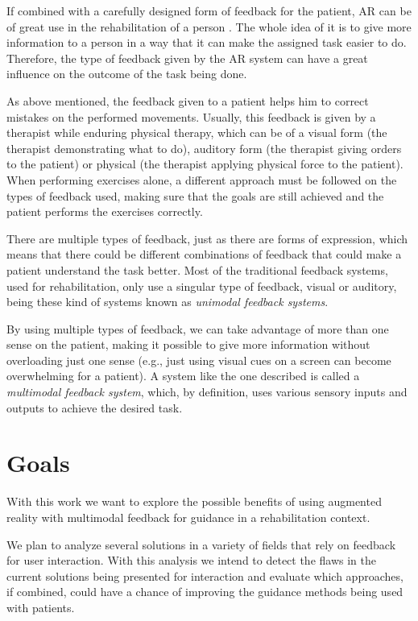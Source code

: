 If combined with a carefully designed form of feedback for the patient,
\ac{AR} can be of great use in the rehabilitation of a person \cite{Sigrist2013}. The whole 
idea of it is to give more information to a person in a way that it can make 
the assigned task easier to do.
Therefore, the type of feedback given by the \ac{AR} system can have a great influence 
on the outcome of the task being done.\cite{Causo2011}

As above mentioned, the feedback given to a patient helps him to correct mistakes on the performed movements.
Usually, this feedback is given by a therapist while enduring physical therapy, which can be of a visual form (the therapist demonstrating what to do), auditory form (the therapist giving orders to the patient) or physical (the therapist applying physical force to the patient). 
When performing exercises alone, a different approach must be followed on the types of feedback used, making sure that the goals 
are still achieved and the patient performs the exercises correctly.

There are multiple types of feedback, just as there are forms of expression, which means that 
there could be different combinations of feedback that could make a patient understand the task better.
Most of the traditional feedback systems, used for rehabilitation, only use a singular type of feedback,
visual or auditory\cite{Design2005}, being these kind of systems known as \emph{unimodal feedback systems}.

By using multiple types of feedback, we can take advantage of more than one sense on the patient, 
making it possible to give more information without overloading just one sense (e.g., just using visual
cues on a screen can become overwhelming for a patient). A system like the one described is called a 
\emph{multimodal feedback system}, which, by definition, uses various sensory inputs and outputs to achieve the desired task.

\section{Goals}

With this work we want to explore the possible benefits of using augmented reality with multimodal 
feedback for guidance in a rehabilitation context.

We plan to analyze several solutions in a variety of fields that rely on feedback for user interaction.
With this analysis we intend to detect the flaws in the current solutions being presented for interaction 
and evaluate which approaches, if combined, could have a chance of improving 
the guidance methods being used with patients.

